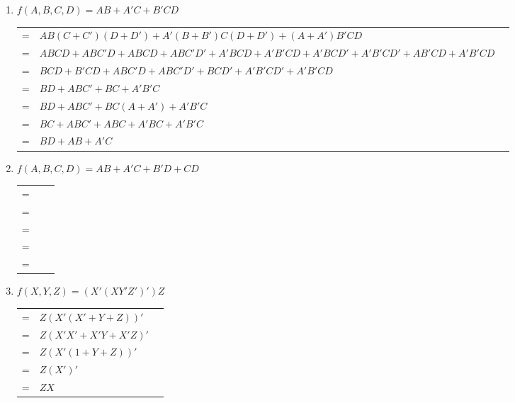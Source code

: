 \documentclass[12pt]{article}
\begin{document}
\begin{enumerate}
    \pagebreak
    
    \item $f(A, B, C, D) = AB + A'C + B'CD$ \\
    \begin{tabular}{r l l}
        = & $AB(C + C')(D + D') + A'(B + B')C(D + D') + (A + A')B'CD$ & \\
        = & $ABCD + ABC'D + ABCD + ABC'D' + A'BCD + A'B'CD + A'BCD' + A'B'CD' + AB'CD + A'B'CD$ & \\
        = & $BCD + B'CD + ABC'D + ABC'D' + BCD' + A'B'CD' + A'B'CD$ & \\
        = & $BD + ABC' + BC + A'B'C$ & \\
        = & $BD + ABC' + BC(A + A') + A'B'C$ & \\
        = & $BC + ABC' + ABC + A'BC + A'B'C$ & \\
        = & $BD + AB + A'C$ & \\
    \end{tabular}
    
    \pagebreak
    
    \item $f(A, B, C, D) = AB + A'C + B'D + CD$ \\
    \begin{tabular}{r l l}
        = & $ $ & \\
        = & $ $ & \\
        = & $ $ & \\
        = & $ $ & \\
        = & $ $ & \\
    \end{tabular}
    
    \pagebreak
    
    \item $f(X, Y, Z) = (X'(XY'Z')')Z$ \\
    \begin{tabular}{r l l}
        = & $Z(X'(X' + Y + Z))'$ & \\
        = & $Z(X'X' + X'Y + X'Z)'$ & \\
        = & $Z(X'(1 + Y + Z))'$ & \\
        = & $Z(X')'$ & \\
        = & $ZX$ & \\
    \end{tabular}

\end{enumerate}
\end{document}
